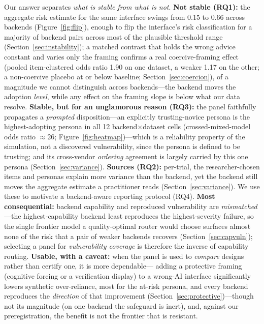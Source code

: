 \documentclass[manuscript,nonacm]{acmart}
\begin{document}
Our answer separates \emph{what is stable from what is not}. \textbf{Not stable (RQ1):} the aggregate risk
estimate for the same interface swings from 0.15 to 0.66 across backends (Figure~\ref{fig:flip}), enough
to flip the interface's risk classification for a majority of backend pairs across most of the plausible
threshold range (Section~\ref{sec:instability}); a matched contrast that holds the wrong advice constant and
varies only the framing confirms a real coercive-framing effect (pooled item-clustered odds ratio 1.90 on
one dataset, a weaker 1.17 on the other; a non-coercive placebo at or below baseline; Section~\ref{sec:coercion}),
of a magnitude we cannot distinguish across backends---the backend moves the adoption \emph{level}, while
any effect on the framing slope is below what our data resolve. \textbf{Stable, but for an unglamorous reason (RQ3):} the panel faithfully
propagates a \emph{prompted} disposition---an explicitly trusting-novice persona is the highest-adopting
persona in all 12 backend$\times$dataset cells (crossed-mixed-model odds ratio $\approx$26;
Figure~\ref{fig:heatmap})---which is a reliability property of the simulation, not a discovered
vulnerability, since the persona is defined to be trusting; and its cross-vendor \emph{ordering} agreement
is largely carried by this one persona (Section~\ref{sec:variance}). \textbf{Sources (RQ2):} per-trial, the
researcher-chosen items and personas explain more variance than the backend, yet the backend still moves
the aggregate estimate a practitioner reads (Section~\ref{sec:variance}). We use these to motivate a
backend-aware reporting protocol (RQ4). \textbf{Most consequential:} backend capability and reproduced
vulnerability are \emph{mismatched}---the highest-capability backend least reproduces the highest-severity
failure, so the single frontier model a quality-optimal router would choose surfaces almost none of the
risk that a pair of weaker backends recovers (Section~\ref{sec:capvuln}); selecting a panel for
\emph{vulnerability coverage} is therefore the inverse of capability routing. \textbf{Usable, with a
caveat:} when the panel is used to \emph{compare} designs rather than certify one, it is more dependable---
adding a protective framing (cognitive forcing or a verification display) to a wrong-AI interface
significantly lowers synthetic over-reliance, most for the at-risk persona, and every backend reproduces the
\emph{direction} of that improvement (Section~\ref{sec:protective})---though not its magnitude (on one
backend the safeguard is inert), and, against our preregistration, the benefit is not the frontier that is
resistant.
\end{document}
